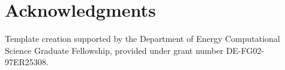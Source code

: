 \documentclass{article}                                                                           %
\begin{document}
\vfill












\pagebreak
\section*{Acknowledgments}

Template creation supported by the Department of Energy Computational Science Graduate Fellowship, provided under grant number DE-FG02-97ER25308.

\pagebreak


\end{document}
